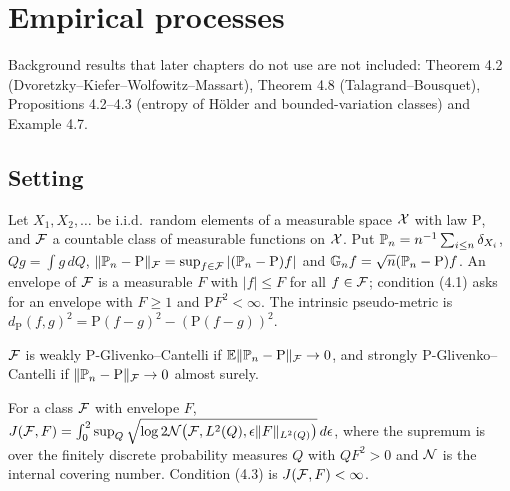 \chapter{Empirical processes}
\label{chap:empirical}

Background results that later chapters do not use are not included: Theorem 4.2 (Dvoretzky--Kiefer--Wolfowitz--Massart), Theorem 4.8 (Talagrand--Bousquet), Propositions 4.2--4.3 (entropy of H\"older and bounded-variation classes) and Example 4.7.

\section{Setting}

\begin{definition}
  \label{def:empirical}
  Let $X_1,X_2,\dots$ be i.i.d.\ random elements of a measurable space $\mathcal{X}$ with law $\mathrm P$, and $\mathcal{F}$ a countable class of measurable functions on $\mathcal{X}$. Put $\mathbb{P}_n=n^{-1}\sum_{i\le n}\delta_{X_i}$, $Qg=\int g\,dQ$, $\|\mathbb{P}_n-\mathrm P\|_{\mathcal{F}}=\sup_{f\in\mathcal{F}}|(\mathbb{P}_n-\mathrm P)f|$ and $\mathbb{G}_n f=\sqrt n(\mathbb{P}_n-\mathrm P)f$. An envelope of $\mathcal{F}$ is a measurable $F$ with $|f|\le F$ for all $f\in\mathcal{F}$; condition (4.1) asks for an envelope with $F\ge1$ and $\mathrm PF^2<\infty$. The intrinsic pseudo-metric is $d_{\mathrm P}(f,g)^2=\mathrm P(f-g)^2-(\mathrm P(f-g))^2$.
\end{definition}

\begin{definition}
  \label{def:han-4-4}
  $\mathcal{F}$ is weakly $\mathrm P$-Glivenko--Cantelli if $\mathbb{E}\|\mathbb{P}_n-\mathrm P\|_{\mathcal{F}}\to0$, and strongly $\mathrm P$-Glivenko--Cantelli if $\|\mathbb{P}_n-\mathrm P\|_{\mathcal{F}}\to0$ almost surely.
\end{definition}

\begin{definition}
  \label{def:uniform-entropy}
  For a class $\mathcal{F}$ with envelope $F$, $J(\mathcal{F},F)=\int_0^2\sup_Q\sqrt{\log2\mathcal{N}\bigl(\mathcal{F},L^2(Q),\epsilon\|F\|_{L^2(Q)}\bigr)}\,d\epsilon$, where the supremum is over the finitely discrete probability measures $Q$ with $QF^2>0$ and $\mathcal{N}$ is the internal covering number. Condition (4.3) is $J(\mathcal{F},F)<\infty$.
\end{definition}


